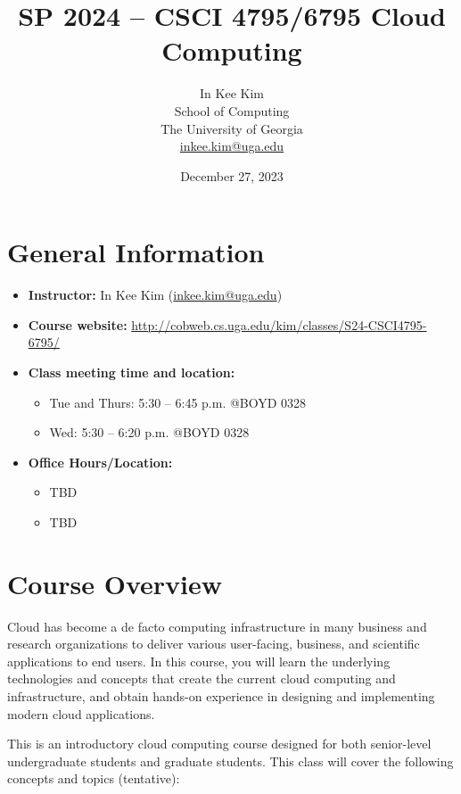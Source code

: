 \documentclass[11pt,letterpaper]{article}
\title{\textbf{SP 2024 -- CSCI 4795/6795 Cloud Computing}}
\author{In Kee Kim\\
School of Computing\\
The University of Georgia\\
\href{mailto:inkee.kim@uga.edu}{inkee.kim@uga.edu}}
\date{December 27, 2023}
\begin{document}
\maketitle

\section{General Information}

\begin{itemize}[leftmargin=*]
    \item \textbf{Instructor:} In Kee Kim (\href{mailto:inkee.kim@uga.edu}{inkee.kim@uga.edu})
    \item \textbf{Course website:} \url{http://cobweb.cs.uga.edu/kim/classes/S24-CSCI4795-6795/}
    \item \textbf{Class meeting time and location:}
    \begin{itemize}
        \item Tue and Thurs: 5:30 -- 6:45 p.m. @BOYD 0328
        \item Wed: 5:30 -- 6:20 p.m. @BOYD 0328
    \end{itemize}
    \item \textbf{Office Hours/Location:}
    \begin{itemize}
        \item TBD
        \item TBD
    \end{itemize}
\end{itemize}

\section{Course Overview}

Cloud has become a de facto computing infrastructure in many business and research organizations to deliver various user-facing, business, and scientific applications to end users. In this course, you will learn the underlying technologies and concepts that create the current cloud computing and infrastructure, and obtain hands-on experience in designing and implementing modern cloud applications.

This is an introductory cloud computing course designed for both senior-level undergraduate students and graduate students. This class will cover the following concepts and topics (tentative):
\end{document}
